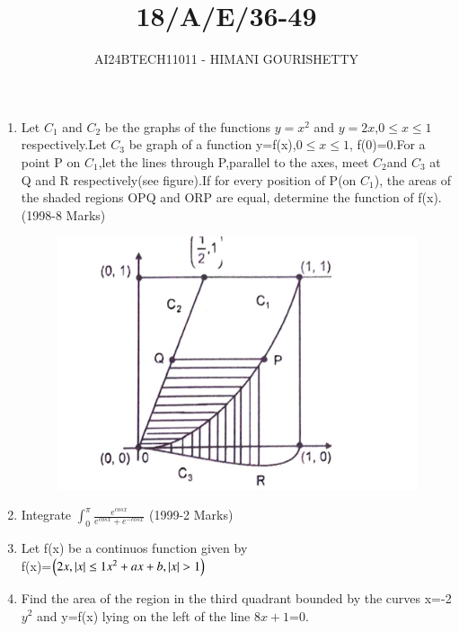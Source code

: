 \documentclass[journal,12pt,twocolumn]{IEEEtran}
\theoremstyle{remark}
\begin{document}

\vspace{3cm}

\title{18/A/E/36-49}
\author{AI24BTECH11011 - HIMANI GOURISHETTY}
\maketitle
\newpage
\bigskip

\renewcommand{\thefigure}{\theenumi}
\renewcommand{\thetable}{\theenumi}

\begin{enumerate}
\item Let $C_1$ and $C_2$ be the graphs of the functions $y=x^2$ and $y=2x$,$0\le x\le1$ respectively.Let $C_3$ be graph of a function y=f(x),$0\le x \le 1$, f(0)=0.For a point P on $C_1$,let the lines through P,parallel to the axes, meet $C_2$and $C_3$ at Q and R respectively(see figure).If for every position of P(on $C_1$), the areas of the shaded regions OPQ and ORP are equal, determine the function of f(x).
\hfill{(1998-8 Marks)}
\begin{figure}[h!]
\centering
\includegraphics[width=1\linewidth]{figs/fig1.png}
\label{fig:11011}
\end{figure}		        
\item Integrate $\int_{0}^{\pi}\frac{e^{cosx}}{e^{cosx}+e^{-cosx}}$
\hfill{(1999-2 Marks)}\\	      			
\item Let f(x) be a continuos function given by \\
f(x)=$\left(2x, \left\vert x\right\vert\le1  x^2+ax+b, \left\vert x\right\vert>1\right)$
\item Find the area of the region in the third quadrant bounded by the curves x=-2$y^2$ and y=f(x) lying on the left of the line $8x+1$=0. 						

\end{enumerate}
\end{document}
